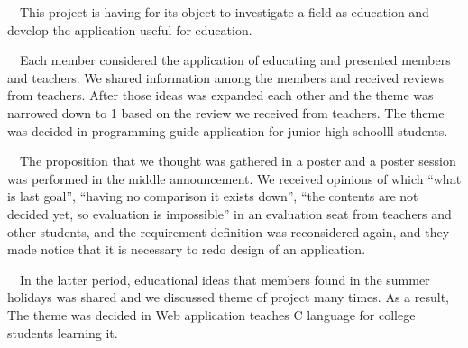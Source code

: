 \documentclass[openany,11pt,papersize]{jsbook}
\newcounter{hoge}
\newcommand{\fake}[1]{\whiledo{\thehoge<70}{#1\stepcounter{hoge}}%
  \setcounter{hoge}{0}}
\begin{document}
\begin{eabstract} 
　This project is having for its object to investigate a field as education and develop the application useful for education.

　Each member considered the application of educating and presented members and teachers. We shared information among the members and received reviews from teachers. After those ideas was expanded each other and the theme was narrowed down to 1 based on the review we received from teachers. The theme was decided in programming guide application for junior high schoolll students.

　The proposition that we thought was gathered in a poster and a poster session was performed in the middle announcement. We received opinions of which ``what is last goal'', ``having no comparison it exists down'', ``the contents are not decided yet, so evaluation is impossible'' in an evaluation seat from teachers and other students, and the requirement definition was reconsidered again, and they made notice that it is necessary to redo design of an application.

　In the latter period, educational ideas that members found in the summer holidays was shared and we discussed theme of project many times. As a result, The theme was decided in Web application teaches C language for college students learning it.


\end{eabstract}
\end{document}
